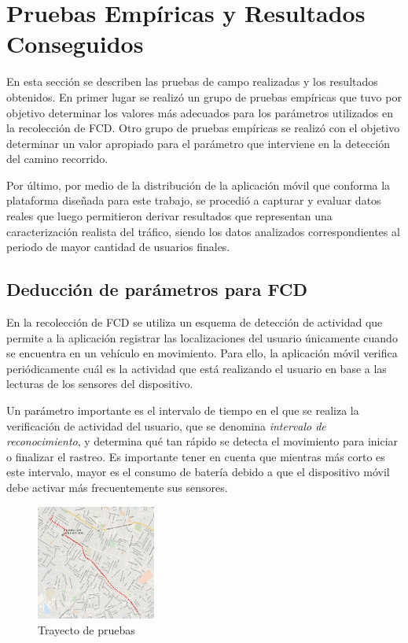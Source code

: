 \section{Pruebas Empíricas y Resultados Conseguidos}
\label{sec:pruebas}

En esta sección se describen las pruebas de campo realizadas y los resultados obtenidos. En primer lugar se realizó un grupo de pruebas empíricas que tuvo por objetivo determinar los valores más adecuados para los parámetros utilizados en la recolección de FCD. Otro grupo de pruebas empíricas se realizó con el objetivo determinar un valor apropiado para el parámetro que interviene en la detección del camino recorrido.

Por último, por medio de la distribución de la aplicación móvil que conforma la plataforma diseñada para este trabajo, se procedió a capturar y evaluar datos reales que luego permitieron derivar resultados que representan una caracterización realista del tráfico, siendo los datos analizados correspondientes al periodo de mayor cantidad de usuarios finales.

\subsection{Deducción de parámetros para FCD}

En la recolección de FCD se utiliza un esquema de detección de actividad que permite a la aplicación registrar las localizaciones del usuario únicamente cuando se encuentra en un vehículo en movimiento. Para ello, la aplicación móvil verifica periódicamente cuál es la actividad que está realizando el usuario en base a las lecturas de los sensores del dispositivo. 

Un parámetro importante es el intervalo de tiempo en el que se realiza la verificación de actividad del usuario, que se denomina \emph{intervalo de reconocimiento}, y determina qué tan rápido se detecta el movimiento para iniciar o finalizar el rastreo. Es importante tener en cuenta que mientras más corto es este intervalo, mayor es el consumo de batería debido a que el dispositivo móvil debe activar más frecuentemente sus sensores. 

\begin{figure}[!htb]
	\centering
	\includegraphics[width=0.35\textwidth]{apartados/figuras/trayecto.png}
	\caption{\label{fig:trayecto} Trayecto de pruebas}	
\end{figure}

